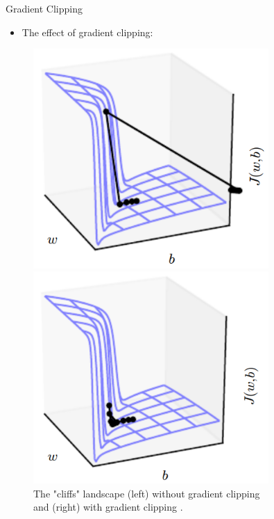 \begin{frame}{Gradient Clipping}
	\begin{itemize}
		\item The effect of gradient clipping:
	\end{itemize}
	\begin{center}
		\begin{figure}[H]
			\centering
			\begin{minipage}{0.45\textwidth}
				\centering
				\includegraphics[width=0.8\textwidth]{Images/gard-clipping-1.png}
			\end{minipage}%
			\begin{minipage}{0.45\textwidth}
				\centering
				\includegraphics[width=0.8\textwidth]{Images/grad-clipping-2.png}
			\end{minipage}
			\caption{The "cliffs" landscape (left) without gradient clipping\\ and (right) with gradient clipping \cite{Goodfellow-et-al-2016}.}
		\end{figure}
	\end{center}
\end{frame}


